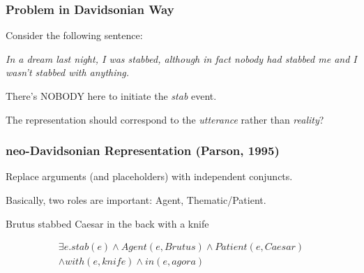 \documentclass{beamer}
\begin{document}
\begin{frame}

    \frametitle{Problem in Davidsonian Way}

    Consider the following sentence:

    \begin{examples}
        \emph{
            In a dream last night, I was stabbed, although in fact nobody had stabbed me and
            I wasn't stabbed with anything.
        }
    \end{examples}

    There's NOBODY here to initiate the \emph{stab} event.

    The representation should correspond to the \emph{utterance} rather than \emph{reality}?

\end{frame}

\begin{frame}
    \frametitle{neo-Davidsonian Representation (Parson, 1995)}

    Replace \alert{arguments} (and placeholders) with \alert{independent conjuncts}. \pause

    Basically, two roles are important: \alert{Agent}, \alert{Thematic/Patient}. \pause

    \begin{center}
        Brutus stabbed Caesar in the back with a knife
    \end{center}

    \begin{gather*}
        \exists e . stab(e) \wedge Agent(e, Brutus) \wedge Patient(e, Caesar) \\
        \wedge with(e, knife) \wedge in(e, agora)
    \end{gather*}

\end{frame}
\end{document}
